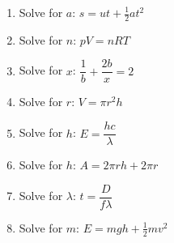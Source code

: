 \begin{exercises}{}
{
\begin{enumerate}[itemsep=5pt, label=\textbf{\arabic*}. ] 
\item Solve for $a$: $s=ut+\frac{1}{2}at^{2}$
\item Solve for $n$: $pV=nRT$ 
\item Solve for $x$: $\dfrac{1}{b}+\dfrac{2b}{x}=2$
\item Solve for $r$: $V = \pi r^{2} h$
\item Solve for $h$: $E=\dfrac{hc}{\lambda}$
\item Solve for $h$: $A=2\pi rh + 2 \pi r$
\item Solve for $\lambda$: $t=\dfrac{D}{f \lambda}$
\item Solve for $m$: $E=mgh + \frac{1}{2}mv^{2}$
\end{enumerate}

}
\end{exercises}


